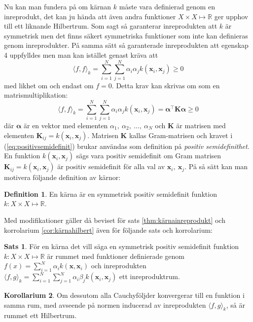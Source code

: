 \documentclass[a4paper, 12pt]{report}
\theoremstyle{definition}
\newtheorem{thm}{Sats}[section]
\newtheorem{cor}[thm]{Korollarium}
\newtheorem{defi}{Definition}[section]
\theoremstyle{remark}
\newcommand{\bfx}{\mathbf{x}}
\begin{document}
Nu kan man fundera på om kärnan $k$ måste vara definierad genom en inreprodukt, det kan ju hända att även andra funktioner $X \times X \longmapsto \mathbb{R}$ ger upphov till ett liknande Hilbertrum. Som sagt så garanterar inreprodukten att $k$ är symmetrisk men det finns säkert symmetriska funktioner som inte kan definieras genom inreprodukter. På samma sätt så garanterade inreprodukten att egenskap 4 uppfylldes men man kan istället genast kräva att
\begin{equation*}
	\langle f, f \rangle_k = \sum_{i=1}^{N}\sum_{j=1}^{N}\alpha_i\alpha_jk\left(\bfx_i,\bfx_j\right) \geq 0
\end{equation*}
med likhet om och endast om $f=0$. Detta krav kan skrivas om som en matrismultiplikation:
\begin{equation}\label{eq:positivsemidefinit}
\langle f, f \rangle_k = \sum_{i=1}^{N}\sum_{j=1}^{N}\alpha_i\alpha_jk\left(\bfx_i,\bfx_j\right) = \boldsymbol{\alpha}^\intercal \mathbf{K} \boldsymbol{\alpha}\geq 0
\end{equation}
där $\boldsymbol{\alpha}$ är en vektor med elementen $\alpha_1,~\alpha_2,~\dots,~\alpha_N$ och $\mathbf{K}$ är matrisen med elementen $\mathbf{K}_{ij}=k\left(\bfx_i,\bfx_j\right)$. Matrisen $\mathbf{K}$ kallas Gram-matrisen och kravet i (\ref{eq:positivsemidefinit}) brukar användas som definition på \emph{positiv semidefinithet}. En funktion $k\left(\bfx_i, \bfx_j\right)$ sägs vara positiv semidefinit om Gram matrisen $\mathbf{K}_{ij}=k\left(\bfx_i,\bfx_j\right)$ är positiv semidefinit för alla val av $\bfx_i,~\bfx_j$. På så sätt kan man motivera följande definition av kärnor:

\begin{defi}
	En kärna är en symmetrisk positiv semidefinit funktion $k: X \times X \longmapsto \mathbb{R}$.
\end{defi}

Med modifikationer gäller då beviset för sats \ref{thm:kärnainreprodukt} och korrolarium \ref{cor:kärnahilbert} även för följande sats och korrolarium:
\begin{thm}
	För en kärna det vill säga en symmetrisk positiv semidefinit funktion $k: X \times X \longmapsto \mathbb{R}$ är rummet med funktioner definierade genom $f\left(x\right) = \sum_{i=1}^{N}\alpha_ik\left(\bfx, \bfx_i\right)$ och inreprodukten $\langle f,g\rangle_k = \sum_{i=1}^{N}\sum_{j=1}^{N} \alpha_i\beta_jk\left(\bfx_i,\bfx_j\right)$ ett inreproduktrum.
\end{thm}
\begin{cor}
	Om dessutom alla Cauchyföljder konvergerar till en funktion i samma rum, med avseende på normen inducerad av inreprodukten $\langle f, g\rangle_k$, så är rummet ett Hilbertrum.
\end{cor}
\end{document}

